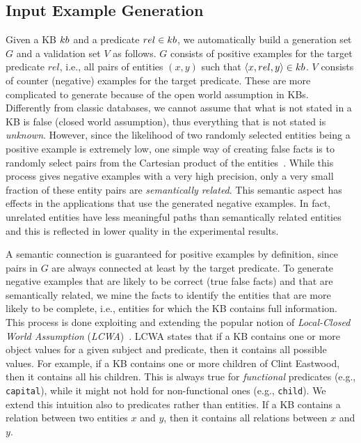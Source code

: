 \subsection{Input Example Generation} \label{sec:ex_generation}
\vspace{-0.2ex}
Given a KB ${\sc kb}$ and a predicate $rel \in {\sc kb}$, we automatically build a generation set $G$ and a validation set $V$ as follows. 
$G$ consists of positive examples for the target predicate $rel$, i.e., all pairs of entities $(x,y)$ such that $\langle x,rel,y\rangle \in {\sc kb}$.
$V$ consists of counter (negative) examples for the target predicate.
These are more complicated to generate because of the open world assumption in KBs. 
Differently from classic databases, we cannot assume that what is not stated in a KB is false (closed world assumption), thus everything that is not stated is {\em unknown}. %
However, since the likelihood of two randomly selected entities being a positive example is extremely low, one simple way of creating false facts is to randomly select pairs from the Cartesian product of the entities~\cite{muggleton1994inductive}. While this process gives negative examples with a very high precision, only a very small fraction of these entity pairs are {\em semantically related}. This semantic aspect has effects in the applications that use the generated negative examples. In fact, unrelated entities have less meaningful paths than semantically related entities and this is reflected in lower quality in the experimental results. 

A semantic connection is guaranteed for positive examples by definition, since pairs in $G$ are always connected at least by the target predicate. To generate negative examples that are likely to be correct (true false facts) and that are semantically related, we mine the facts to identify the entities that are more likely to be complete, i.e., entities for which the KB contains full information. This process is done exploiting and extending the popular notion of \emph{Local-Closed World Assumption} (\emph{LCWA})~\cite{dong2014data,galarraga2015fast}. 
%
LCWA states that if a KB contains one or more object values for a given subject and predicate, then it contains all possible values. For example, if a KB contains one or more children of Clint Eastwood, then it contains all his children. This is always true for \emph{functional} predicates (e.g., \texttt{capital}), 
while it might not hold for non-functional ones (e.g., \texttt{child}). 
We extend this intuition also to predicates rather than entities. If a KB contains a relation between two entities $x$ and $y$, then it contains all relations between $x$ and $y$.

